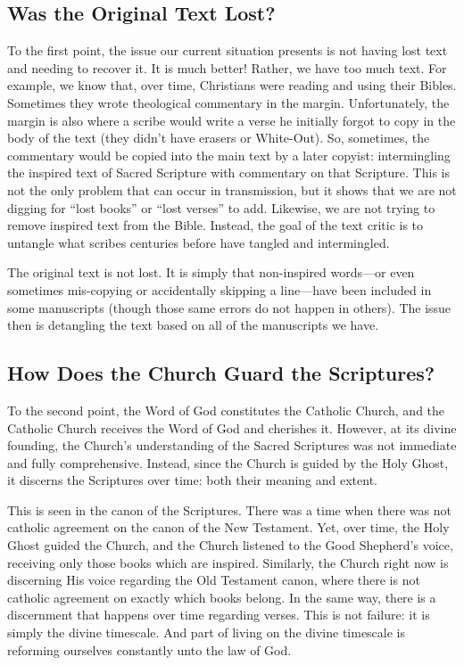 \begin{onecolumn}
\subsection{Was the Original Text Lost?}
To the first point, the issue our current situation presents is not having lost text and needing to recover it. It is much better! Rather, we have too much text. For example, we know that, over time, Christians were reading and using their Bibles. Sometimes they wrote theological commentary in the margin. Unfortunately, the margin is also where a scribe would write a verse he initially forgot to copy in the body of the text (they didn't have erasers or White-Out). So, sometimes, the commentary would be copied into the main text by a later copyist: intermingling the inspired text of Sacred Scripture with commentary on that Scripture. This is not the only problem that can occur in transmission, but it shows that we are not digging for ``lost books'' or ``lost verses'' to add. Likewise, we are not trying to remove inspired text from the Bible. Instead, the goal of the text critic is to untangle what scribes centuries before have tangled and intermingled.

The original text is not lost. It is simply that non-inspired words---or even sometimes mis-copying or accidentally skipping a line---have been included in some manuscripts (though those same errors do not happen in others). The issue then is detangling the text based on all of the manuscripts we have.
\subsection{How Does the Church Guard the Scriptures?}
To the second point, the Word of God constitutes the Catholic Church, and the Catholic Church receives the Word of God and cherishes it. However, at its divine founding, the Church's understanding of the Sacred Scriptures was not immediate and fully comprehensive. Instead, since the Church is guided by the Holy Ghost, it discerns the Scriptures over time: both their meaning and extent.

This is seen in the canon of the Scriptures. There was a time when there was not catholic agreement on the canon of the New Testament. Yet, over time, the Holy Ghost guided the Church, and the Church listened to the Good Shepherd's voice, receiving only those books which are inspired. Similarly, the Church right now is discerning His voice regarding the Old Testament canon, where there is not catholic agreement on exactly which books belong. In the same way, there is a discernment that happens over time regarding verses. This is not failure: it is simply the divine timescale. And part of living on the divine timescale is reforming ourselves constantly unto the law of God.


\end{onecolumn}
